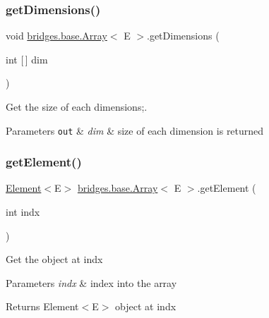 \subsubsection{\texorpdfstring{get\+Dimensions()}{getDimensions()}}
{\footnotesize\ttfamily void \mbox{\hyperlink{classbridges_1_1base_1_1_array}{bridges.\+base.\+Array}}$<$ E $>$.get\+Dimensions (\begin{DoxyParamCaption}\item[{int \mbox{[}$\,$\mbox{]}}]{dim }\end{DoxyParamCaption})}



Get the size of each dimensions;. 


\begin{DoxyParams}[1]{Parameters}
\mbox{\tt out}  & {\em dim} & size of each dimension is returned \\
\hline
\end{DoxyParams}
\mbox{\label{classbridges_1_1base_1_1_array_a0e690cbe2606e44cce99b56802b63e0e}} 
\subsubsection{\texorpdfstring{get\+Element()}{getElement()}}
{\footnotesize\ttfamily \mbox{\hyperlink{classbridges_1_1base_1_1_element}{Element}}$<$E$>$ \mbox{\hyperlink{classbridges_1_1base_1_1_array}{bridges.\+base.\+Array}}$<$ E $>$.get\+Element (\begin{DoxyParamCaption}\item[{int}]{indx }\end{DoxyParamCaption})\hspace{0.3cm}{\ttfamily [protected]}}

Get the object at \textquotesingle{}indx\textquotesingle{}


\begin{DoxyParams}{Parameters}
{\em indx} & index into the array \\
\hline
\end{DoxyParams}
\begin{DoxyReturn}{Returns}
Element$<$\+E$>$ object at \textquotesingle{}indx\textquotesingle{} 
\end{DoxyReturn}
\mbox{\label{classbridges_1_1base_1_1_array_a808da9a62df3f0e7a905ec895a82087a}} 

